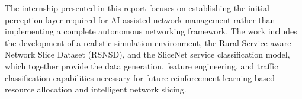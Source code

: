 \documentclass[12pt,a4paper]{report}
\begin{document}
	The internship presented in this report focuses on establishing the initial perception layer required for AI-assisted network management rather than implementing a complete autonomous networking framework. The work includes the development of a realistic simulation environment, the Rural Service-aware Network Slice Dataset (RSNSD), and the SliceNet service classification model, which together provide the data generation, feature engineering, and traffic classification capabilities necessary for future reinforcement learning-based resource allocation and intelligent network slicing.
	
	

\end{document}
